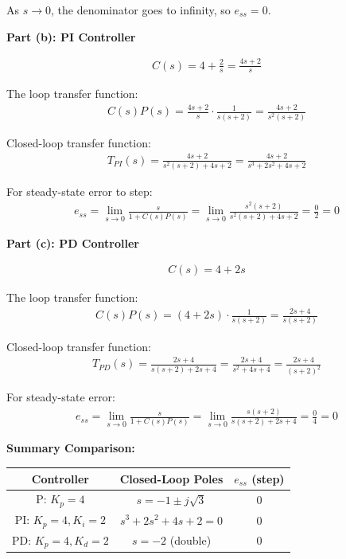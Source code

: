 \documentclass[11pt,a4paper]{article}
\begin{document}
As $s \to 0$, the denominator goes to infinity, so $e_{ss} = 0$.

\textbf{Part (b): PI Controller}

\begin{align}
  C(s) = 4 + \frac{2}{s} = \frac{4s + 2}{s}
\end{align}

The loop transfer function:
\begin{align}
  C(s)P(s) = \frac{4s+2}{s} \cdot \frac{1}{s(s+2)} = \frac{4s+2}{s^2(s+2)}
\end{align}

Closed-loop transfer function:
\begin{align}
  T_{PI}(s) = \frac{4s+2}{s^2(s+2) + 4s + 2} = \frac{4s+2}{s^3 + 2s^2 + 4s + 2}
\end{align}

For steady-state error to step:
\begin{align}
  e_{ss} = \lim_{s \to 0} \frac{s}{1 + C(s)P(s)} = \lim_{s \to 0} \frac{s^2(s+2)}{s^2(s+2) + 4s + 2} = \frac{0}{2} = 0
\end{align}

\textbf{Part (c): PD Controller}

\begin{align}
  C(s) = 4 + 2s
\end{align}

The loop transfer function:
\begin{align}
  C(s)P(s) = (4 + 2s) \cdot \frac{1}{s(s+2)} = \frac{2s+4}{s(s+2)}
\end{align}

Closed-loop transfer function:
\begin{align}
  T_{PD}(s) = \frac{2s+4}{s(s+2) + 2s + 4} = \frac{2s+4}{s^2 + 4s + 4} = \frac{2s+4}{(s+2)^2}
\end{align}

For steady-state error:
\begin{align}
  e_{ss} = \lim_{s \to 0} \frac{s}{1 + C(s)P(s)} = \lim_{s \to 0} \frac{s(s+2)}{s(s+2) + 2s + 4} = \frac{0}{4} = 0
\end{align}

\textbf{Summary Comparison:}

\begin{center}
  \begin{tabular}{|c|c|c|}
    \hline
    Controller & Closed-Loop Poles & $e_{ss}$ (step) \\
    \hline
    P: $K_p = 4$ & $s = -1 \pm j\sqrt{3}$ & 0 \\
    PI: $K_p = 4, K_i = 2$ & $s^3 + 2s^2 + 4s + 2 = 0$ & 0 \\
    PD: $K_p = 4, K_d = 2$ & $s = -2$ (double) & 0 \\
    \hline
  \end{tabular}
\end{center}
\end{document}
